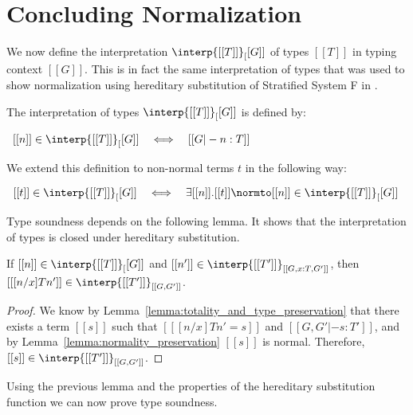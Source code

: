 \section{Concluding Normalization}
\label{sec:concluding_normalization}
We now define the interpretation $\interp{[[T]]}_[[G]]$ of types
$[[T]]$ in typing context $[[G]]$.  This is in fact the same
interpretation of types that was used to show normalization using
hereditary substitution of Stratified System F in \cite{Eades:2010}.
\begin{definition}
  \label{def:semantics}
  The interpretation of types $\interp{[[T]]}_[[G]]$ is defined by:
  \begin{center}
    \begin{math}
      \begin{array}{lll}
        [[n]] \in \interp{[[T]]}_[[G]] & \iff & [[G |- n : T]]
      \end{array}
    \end{math}
  \end{center}
  We extend this definition to non-normal terms $t$ in the following way:
  \begin{center}
    \begin{math}
      \begin{array}{lll}
        [[t]] \in \interp{[[T]]}_[[G]] & \iff & \exists [[n]].[[t]] \normto [[n]] \in \interp{[[T]]}_[[G]]
      \end{array}
    \end{math}
  \end{center}
\end{definition}
Type soundness depends on the following lemma. It shows that the
interpretation of types is closed under hereditary substitution.
\begin{lemma}
  \label{lemma:substitution_for_the_interpretation_of_types}
  If $[[n]] \in \interp{[[T]]}_[[G]]$ and $[[n']] \in \interp{[[T']]}_{[[G,x:T,G']]}$, then
  $[[ [n/x] T n']] \in \interp{[[T']]}_{[[G,G']]}$.
\end{lemma}
\begin{proof}
  We know by Lemma~\ref{lemma:totality_and_type_preservation} that there exists a term $[[s]]$ such that
  $[[ [n/x] T n' = s]]$ and $[[G,G' |- s:T']]$, and by Lemma~\ref{lemma:normality_preservation} $[[s]]$ is
  normal.  Therefore, $[[s]] \in \interp{[[T']]}_{[[G,G']]}$.
\end{proof}
Using the previous lemma and the properties of the hereditary
substitution function we can now prove type soundness.
